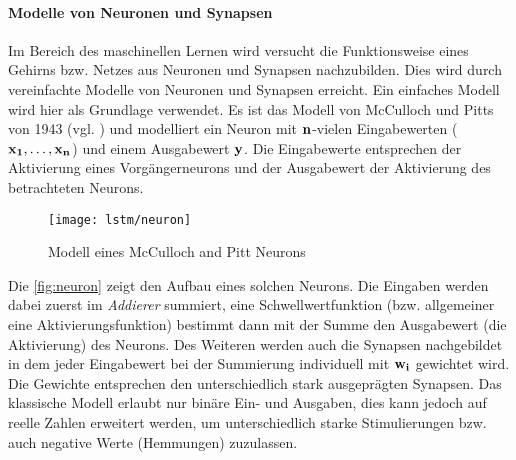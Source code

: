\paragraph{Modelle von Neuronen und Synapsen}
Im Bereich des maschinellen Lernen wird versucht die Funktionsweise eines
Gehirns bzw. Netzes aus Neuronen und Synapsen nachzubilden. Dies wird durch
vereinfachte Modelle von Neuronen und Synapsen erreicht. Ein einfaches Modell
wird hier als Grundlage verwendet. Es ist das Modell von McCulloch und Pitts von
1943 (vgl. \cite{Mcc43}) und modelliert ein Neuron mit $\bf n$-vielen Eingabewerten
($\bf x_1,\ldots,x_n$) und einem Ausgabewert $\bf y$. Die Eingabewerte entsprechen der
Aktivierung eines Vorgängerneurons und der Ausgabewert der Aktivierung des
betrachteten Neurons.
\begin{figure}[htbp]
    \centering
   \texttt{[image: lstm/neuron]}
\caption{Modell eines McCulloch and Pitt Neurons}
\label{fig:neuron}
\end{figure}  
Die \autoref{fig:neuron} zeigt den Aufbau eines solchen Neurons. Die Eingaben
werden dabei zuerst im \textit{Addierer} summiert, eine Schwellwertfunktion (bzw.
allgemeiner eine Aktivierungsfunktion) bestimmt dann mit der Summe den
Ausgabewert (die Aktivierung) des Neurons. Des Weiteren werden auch die Synapsen
nachgebildet in dem jeder Eingabewert bei der Summierung individuell mit $\bf w_i$
gewichtet wird. Die Gewichte entsprechen den unterschiedlich stark ausgeprägten
Synapsen.
Das klassische Modell erlaubt nur binäre Ein- und Ausgaben, dies kann jedoch auf
reelle Zahlen erweitert werden, um unterschiedlich starke Stimulierungen bzw.
auch negative Werte (Hemmungen) zuzulassen.

